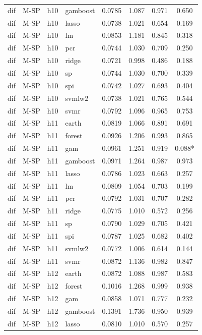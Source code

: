 \begin{ThreePartTable}
\begin{longtable}[t]{llclcccc}
dif & M-SP & h10 & gamboost & 0.0785 & 1.087 & 0.971 & 0.650\\
dif & M-SP & h10 & lasso & 0.0738 & 1.021 & 0.654 & 0.169\\
dif & M-SP & h10 & lm & 0.0853 & 1.181 & 0.845 & 0.318\\
dif & M-SP & h10 & pcr & 0.0744 & 1.030 & 0.709 & 0.250\\
dif & M-SP & h10 & ridge & 0.0721 & 0.998 & 0.486 & 0.188\\
dif & M-SP & h10 & sp & 0.0744 & 1.030 & 0.700 & 0.339\\
dif & M-SP & h10 & spi & 0.0742 & 1.027 & 0.693 & 0.404\\
dif & M-SP & h10 & svmlw2 & 0.0738 & 1.021 & 0.765 & 0.544\\
dif & M-SP & h10 & svmr & 0.0792 & 1.096 & 0.965 & 0.753\\
\addlinespace
dif & M-SP & h11 & earth & 0.0819 & 1.066 & 0.891 & 0.691\\
dif & M-SP & h11 & forest & 0.0926 & 1.206 & 0.993 & 0.865\\
dif & M-SP & h11 & gam & 0.0961 & 1.251 & 0.919 & 0.088*\\
dif & M-SP & h11 & gamboost & 0.0971 & 1.264 & 0.987 & 0.973\\
dif & M-SP & h11 & lasso & 0.0786 & 1.023 & 0.663 & 0.257\\
dif & M-SP & h11 & lm & 0.0809 & 1.054 & 0.703 & 0.199\\
dif & M-SP & h11 & pcr & 0.0792 & 1.031 & 0.707 & 0.282\\
dif & M-SP & h11 & ridge & 0.0775 & 1.010 & 0.572 & 0.256\\
dif & M-SP & h11 & sp & 0.0790 & 1.029 & 0.705 & 0.421\\
dif & M-SP & h11 & spi & 0.0787 & 1.025 & 0.682 & 0.402\\
dif & M-SP & h11 & svmlw2 & 0.0772 & 1.006 & 0.614 & 0.144\\
dif & M-SP & h11 & svmr & 0.0872 & 1.136 & 0.982 & 0.847\\
\addlinespace
dif & M-SP & h12 & earth & 0.0872 & 1.088 & 0.987 & 0.583\\
dif & M-SP & h12 & forest & 0.1016 & 1.268 & 0.999 & 0.938\\
dif & M-SP & h12 & gam & 0.0858 & 1.071 & 0.777 & 0.232\\
dif & M-SP & h12 & gamboost & 0.1391 & 1.736 & 0.950 & 0.939\\
dif & M-SP & h12 & lasso & 0.0810 & 1.010 & 0.570 & 0.257\\

\end{longtable}
\end{ThreePartTable}
